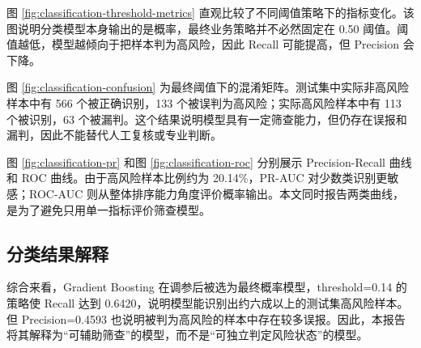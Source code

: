 

图 \ref{fig:classification-threshold-metrics} 直观比较了不同阈值策略下的指标变化。该图说明分类模型本身输出的是概率，最终业务策略并不必然固定在 0.50 阈值。阈值越低，模型越倾向于把样本判为高风险，因此 Recall 可能提高，但 Precision 会下降。


图 \ref{fig:classification-confusion} 为最终阈值下的混淆矩阵。测试集中实际非高风险样本中有 566 个被正确识别，133 个被误判为高风险；实际高风险样本中有 113 个被识别，63 个被漏判。这个结果说明模型具有一定筛查能力，但仍存在误报和漏判，因此不能替代人工复核或专业判断。


图 \ref{fig:classification-pr} 和图 \ref{fig:classification-roc} 分别展示 Precision-Recall 曲线和 ROC 曲线。由于高风险样本比例约为 20.14\%，PR-AUC 对少数类识别更敏感；ROC-AUC 则从整体排序能力角度评价概率输出。本文同时报告两类曲线，是为了避免只用单一指标评价筛查模型。



\subsection{分类结果解释}

综合来看，Gradient Boosting 在调参后被选为最终概率模型，threshold=0.14 的策略使 Recall 达到 0.6420，说明模型能识别出约六成以上的测试集高风险样本。但 Precision=0.4593 也说明被判为高风险的样本中存在较多误报。因此，本报告将其解释为“可辅助筛查”的模型，而不是“可独立判定风险状态”的模型。
